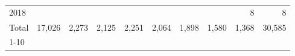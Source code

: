 \begin{table}[!h]
\begin{tabular}{llllllllll}
\multicolumn{1}{l}{\hspace{1em}2018} &
  \multicolumn{1}{|r}{} &
  \multicolumn{1}{r}{} &
  \multicolumn{1}{r}{} &
  \multicolumn{1}{r}{} &
  \multicolumn{1}{r}{} &
  \multicolumn{1}{r}{} &
  \multicolumn{1}{r}{} &
  \multicolumn{1}{r}{8} &
  \multicolumn{1}{r}{8} \\
\multicolumn{1}{l}{\hspace{1em}Total} &
  \multicolumn{1}{|r}{17,026} &
  \multicolumn{1}{r}{2,273} &
  \multicolumn{1}{r}{2,125} &
  \multicolumn{1}{r}{2,251} &
  \multicolumn{1}{r}{2,064} &
  \multicolumn{1}{r}{1,898} &
  \multicolumn{1}{r}{1,580} &
  \multicolumn{1}{r}{1,368} &
  \multicolumn{1}{r}{30,585} \\
\cline{1-10}
\end{tabular}
\end{table}
